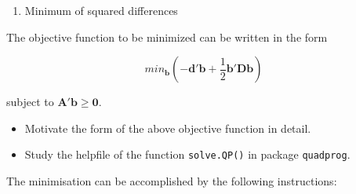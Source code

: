 \documentclass[
]{book}
\providecommand{\tightlist}{%
  \setlength{\itemsep}{0pt}\setlength{\parskip}{0pt}}
\begin{document}
\begin{enumerate}
\def\labelenumi{(\roman{enumi})}
\tightlist
\item
  Minimum of squared differences
\end{enumerate}

The objective function to be minimized can be written in the form

\[
min_\mathbf{b} \left( -\mathbf{d'b} + \frac{1}{2}\mathbf{b'Db} \right)
\]

subject to \(\mathbf{A'b} \ge \mathbf{0}\).

\begin{itemize}
\tightlist
\item
  Motivate the form of the above objective function in detail.
\item
  Study the helpfile of the function \texttt{solve.QP()} in package \texttt{quadprog}.
\end{itemize}

The minimisation can be accomplished by the following instructions:
\end{document}
